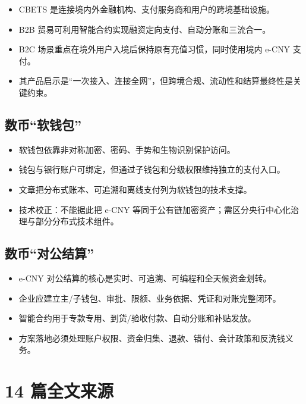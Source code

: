 \begin{itemize}
\tightlist
\item
  CBETS 是连接境内外金融机构、支付服务商和用户的跨境基础设施。
\item
  B2B 贸易可利用智能合约实现融资定向支付、自动分账和三流合一。
\item
  B2C 场景重点在境外用户入境后保持原有充值习惯，同时使用境内 e-CNY 支付。
\item
  其产品启示是``一次接入、连接全网''，但跨境合规、流动性和结算最终性是关键约束。
\end{itemize}

\section{数币``软钱包''}\label{ux6570ux5e01ux8f6fux94b1ux5305}

\begin{itemize}
\tightlist
\item
  软钱包依靠非对称加密、密码、手势和生物识别保护访问。
\item
  钱包与银行账户可绑定，但通过子钱包和分级权限维持独立的支付入口。
\item
  文章把分布式账本、可追溯和离线支付列为软钱包的技术支撑。
\item
  技术校正：不能据此把 e-CNY
  等同于公有链加密资产；需区分央行中心化治理与部分分布式技术组件。
\end{itemize}

\section{数币``对公结算''}\label{ux6570ux5e01ux5bf9ux516cux7ed3ux7b97}

\begin{itemize}
\tightlist
\item
  e-CNY 对公结算的核心是实时、可追溯、可编程和全天候资金划转。
\item
  企业应建立主/子钱包、审批、限额、业务依据、凭证和对账完整闭环。
\item
  智能合约用于专款专用、到货/验收付款、自动分账和补贴发放。
\item
  方案落地必须处理账户权限、资金归集、退款、错付、会计政策和反洗钱义务。
\end{itemize}

\chapter{14 篇全文来源}\label{14-ux7bc7ux5168ux6587ux6765ux6e90}

